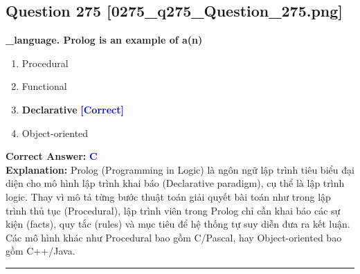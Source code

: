 \documentclass[11pt,a4paper]{article}
\begin{document}
\begin{minipage}{\textwidth}
\subsection*{Question 275 \quad \footnotesize{[0275\_q275\_Question\_275.png]}}
\noindent \textbf{\_language. Prolog is an example of a(n)}

\begin{enumerate}[label=\Alph*.]
    \item Procedural
    \item Functional
    \item \textbf{Declarative} \hfill \textcolor{blue}{\textbf{[Correct]}}
    \item Object-oriented
\end{enumerate}

\noindent \textbf{Correct Answer:} \textcolor{blue}{\textbf{C}} \\[2pt]
\noindent \textbf{Explanation:} Prolog (Programming in Logic) là ngôn ngữ lập trình tiêu biểu đại diện cho mô hình lập trình khai báo (Declarative paradigm), cụ thể là lập trình logic. Thay vì mô tả từng bước thuật toán giải quyết bài toán như trong lập trình thủ tục (Procedural), lập trình viên trong Prolog chỉ cần khai báo các sự kiện (facts), quy tắc (rules) và mục tiêu để hệ thống tự suy diễn đưa ra kết luận. Các mô hình khác như Procedural bao gồm C/Pascal, hay Object-oriented bao gồm C++/Java.

\par\vspace{0.3cm}
\hrule
\vspace{0.3cm}
\end{minipage}
\end{document}
